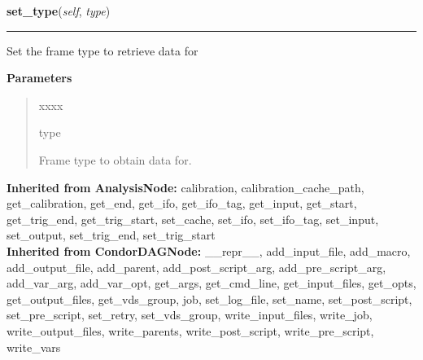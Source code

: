     \label{stochastic:LSCDataFindNode:set_type}
    \vspace{0.5ex}

    \begin{boxedminipage}{\textwidth}

    \raggedright \textbf{set\_type}(\textit{self}, \textit{type})

    \vspace{-1.5ex}

    \rule{\textwidth}{0.5\fboxrule}
    Set the frame type to retrieve data for

    \vspace{1ex}

      \textbf{Parameters}
      \begin{quote}
        \begin{Ventry}{xxxx}

          \item[type]

          Frame type to obtain data for.

        \end{Ventry}

      \end{quote}

    \vspace{1ex}

    \end{boxedminipage}

  \textbf{Inherited from AnalysisNode:}
    calibration,
    calibration\_cache\_path,
    get\_calibration,
    get\_end,
    get\_ifo,
    get\_ifo\_tag,
    get\_input,
    get\_start,
    get\_trig\_end,
    get\_trig\_start,
    set\_cache,
    set\_ifo,
    set\_ifo\_tag,
    set\_input,
    set\_output,
    set\_trig\_end,
    set\_trig\_start
    \\
  \textbf{Inherited from CondorDAGNode:}
    \_\_repr\_\_,
    add\_input\_file,
    add\_macro,
    add\_output\_file,
    add\_parent,
    add\_post\_script\_arg,
    add\_pre\_script\_arg,
    add\_var\_arg,
    add\_var\_opt,
    get\_args,
    get\_cmd\_line,
    get\_input\_files,
    get\_opts,
    get\_output\_files,
    get\_vds\_group,
    job,
    set\_log\_file,
    set\_name,
    set\_post\_script,
    set\_pre\_script,
    set\_retry,
    set\_vds\_group,
    write\_input\_files,
    write\_job,
    write\_output\_files,
    write\_parents,
    write\_post\_script,
    write\_pre\_script,
    write\_vars

